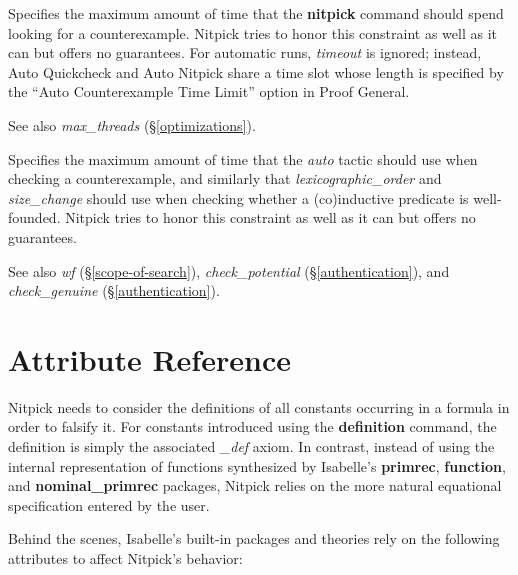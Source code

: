 \documentclass[a4paper,12pt]{article}
\begin{document}
\begin{enum}
Specifies the maximum amount of time that the \textbf{nitpick} command should
spend looking for a counterexample. Nitpick tries to honor this constraint as
well as it can but offers no guarantees. For automatic runs,
\textit{timeout} is ignored; instead, Auto Quickcheck and Auto Nitpick share
a time slot whose length is specified by the ``Auto Counterexample Time
Limit'' option in Proof General.

\nopagebreak
{\small See also \textit{max\_threads} (\S\ref{optimizations}).}

Specifies the maximum amount of time that the \textit{auto} tactic should use
when checking a counterexample, and similarly that \textit{lexicographic\_order}
and \textit{size\_change} should use when checking whether a (co)in\-duc\-tive
predicate is well-founded. Nitpick tries to honor this constraint as well as it
can but offers no guarantees.

\nopagebreak
{\small See also \textit{wf} (\S\ref{scope-of-search}),
\textit{check\_potential} (\S\ref{authentication}),
and \textit{check\_genuine} (\S\ref{authentication}).}
\end{enum}

\section{Attribute Reference}
\label{attribute-reference}

Nitpick needs to consider the definitions of all constants occurring in a
formula in order to falsify it. For constants introduced using the
\textbf{definition} command, the definition is simply the associated
\textit{\_def} axiom. In contrast, instead of using the internal representation
of functions synthesized by Isabelle's \textbf{primrec}, \textbf{function}, and
\textbf{nominal\_primrec} packages, Nitpick relies on the more natural
equational specification entered by the user.

Behind the scenes, Isabelle's built-in packages and theories rely on the
following attributes to affect Nitpick's behavior:
\end{document}
